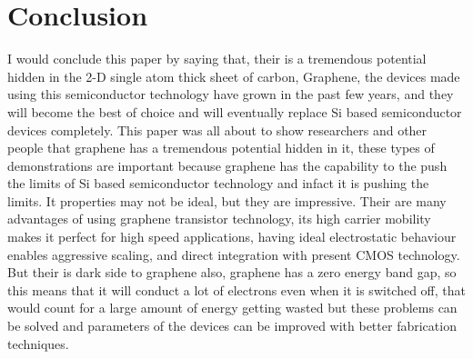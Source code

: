 \documentclass[conference]{IEEEtran}
\begin{document}
\section{\textbf{Conclusion}}
I would conclude this paper by saying that, their is a tremendous potential hidden in the 2-D single atom thick sheet of carbon, Graphene, the devices made using this semiconductor technology have grown in the past few years, and they will become the best of choice and will eventually replace Si based semiconductor devices completely. This paper was all about to show researchers and other people that graphene has a tremendous potential hidden in it, these types of demonstrations are important because graphene has the capability to the push the limits of Si based semiconductor technology and infact it is pushing the limits. It properties may not be ideal, but they are impressive. Their are many advantages of using graphene transistor technology, its high carrier mobility makes it perfect for high speed applications, having ideal electrostatic behaviour enables aggressive scaling, and direct integration with present CMOS technology. But their is dark side to graphene also, graphene has a zero energy band gap, so this means that it will conduct a lot of electrons even when it is switched off, that would count for a large amount of energy getting wasted but these problems can be solved and parameters of the devices can be improved with better fabrication techniques.
\\ \\
\end{document}
